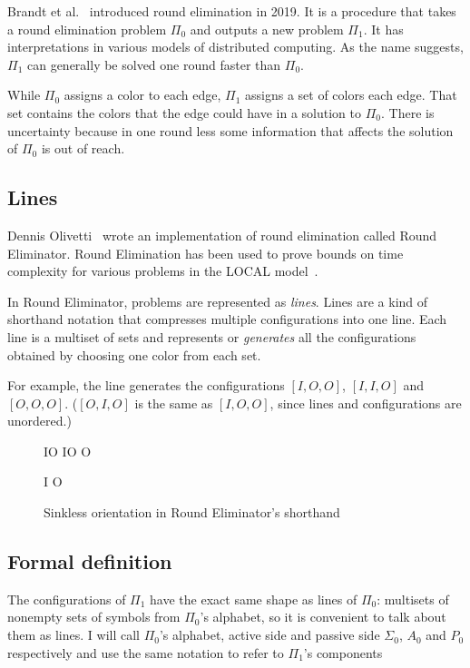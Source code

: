 \documentclass[english, 12pt, a4paper, sci, a-1b, online]{aaltothesis}
\begin{document}
Brandt et al.~\cite{speedup} introduced round elimination in 2019. It is a procedure that takes a round elimination problem $\Pi_0$ and outputs a new problem $\Pi_1$. It has interpretations in various models of distributed computing. As the name suggests, $\Pi_1$ can generally be solved one round faster than $\Pi_0$.

While $\Pi_0$ assigns a color to each edge, $\Pi_1$ assigns a set of colors each edge. That set contains the colors that the edge could have in a solution to $\Pi_0$. There is uncertainty because in one round less some information that affects the solution of $\Pi_0$ is out of reach.

\subsection{Lines}

Dennis Olivetti~\cite{RE} wrote an implementation of round elimination called Round Eliminator. Round Elimination has been used to prove bounds on time complexity for various problems in the LOCAL model~\cite{tc1, tc2, tc3}.

In Round Eliminator, problems are represented as \emph{lines}. Lines are a kind of shorthand notation that compresses multiple configurations into one line. Each line is a multiset of sets and represents or \emph{generates} all the configurations obtained by choosing one color from each set.~\cite{RE}

For example, the line  generates the configurations $[I, O, O]$, $[I, I, O]$ and $[O, O, O]$. ($[O, I, O]$ is the same as $[I, O, O]$, since lines and configurations are unordered.)

\begin{figure}[h]
  \centering
  \begin{tcolorbox}[width=.22\textwidth, nobeforeafter, title=active side]
  IO IO O
  \end{tcolorbox}
  \begin{tcolorbox}[width=.22\textwidth, nobeforeafter, title=passive side]
  I O
  \end{tcolorbox}
  \caption{Sinkless orientation in Round Eliminator's shorthand}
\end{figure}

\subsection{Formal definition}
The configurations of $\Pi_1$ have the exact same shape as lines of $\Pi_0$: multisets of nonempty sets of symbols from $\Pi_0$'s alphabet, so it is convenient to talk about them as lines. I will call $\Pi_0$'s alphabet, active side and passive side $\Sigma_0$, $A_0$ and $P_{0}$ respectively and use the same notation to refer to $\Pi_{1}$'s components
\end{document}
